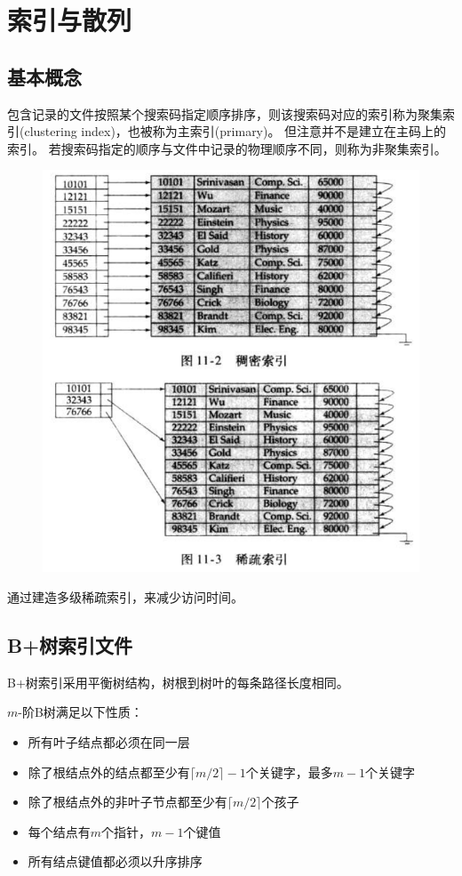 
\section{索引与散列} %
\subsection{基本概念}
\begin{definition}[聚集索引]
包含记录的文件按照某个搜索码指定顺序排序，则该搜索码对应的索引称为聚集索引(clustering index)，也被称为主索引(primary)。
但注意并不是建立在主码上的索引。
若搜索码指定的顺序与文件中记录的物理顺序不同，则称为非聚集索引。
\end{definition}

\begin{figure}[H]
\centering
\includegraphics[width=0.6\linewidth]{fig/dense_sparse_indexing.png}
\end{figure}

通过建造多级稀疏索引，来减少访问时间。

\subsection{B+树索引文件}
B+树索引采用平衡树结构，树根到树叶的每条路径长度相同。

$m$-阶B树满足以下性质：
\begin{itemize}
	\item 所有叶子结点都必须在同一层
	\item 除了根结点外的结点都至少有$\lceil m/2\rceil -1$个关键字，最多$m-1$个关键字
	\item 除了根结点外的非叶子节点都至少有$\lceil m/2\rceil$个孩子
	\item 每个结点有$m$个指针，$m-1$个键值
	\item 所有结点键值都必须以升序排序
\end{itemize}

